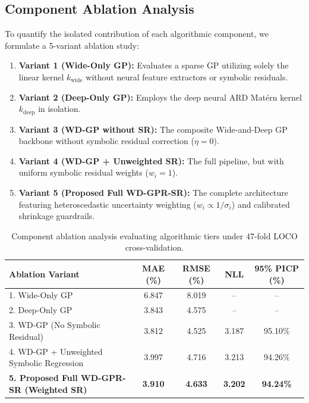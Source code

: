 \documentclass[a4paper,fleqn]{cas-sc}
\begin{document}
\subsection{Component Ablation Analysis}
To quantify the isolated contribution of each algorithmic component, we formulate a 5-variant ablation study:
\begin{enumerate}
    \item \textbf{Variant 1 (Wide-Only GP):} Evaluates a sparse GP utilizing solely the linear kernel $k_{\text{wide}}$ without neural feature extractors or symbolic residuals.
    \item \textbf{Variant 2 (Deep-Only GP):} Employs the deep neural ARD Matérn kernel $k_{\text{deep}}$ in isolation.
    \item \textbf{Variant 3 (WD-GP without SR):} The composite Wide-and-Deep GP backbone without symbolic residual correction ($\eta=0$).
    \item \textbf{Variant 4 (WD-GP + Unweighted SR):} The full pipeline, but with uniform symbolic residual weights ($w_i = 1$).
    \item \textbf{Variant 5 (Proposed Full WD-GPR-SR):} The complete architecture featuring heteroscedastic uncertainty weighting ($w_i \propto 1/\sigma_i$) and calibrated shrinkage guardrails.
\end{enumerate}

\begin{table}[pos=htbp]
\centering
\caption{Component ablation analysis evaluating algorithmic tiers under 47-fold LOCO cross-validation.}
\label{tab:ablation_summary}
\small
\renewcommand{\arraystretch}{1.15}
\begin{tabular}{lcccc}
\toprule
\textbf{Ablation Variant} & \textbf{MAE (\%)} & \textbf{RMSE (\%)} & \textbf{NLL} & \textbf{95\% PICP (\%)} \\
\midrule
1. Wide-Only GP & 6.847 & 8.019 & -- & -- \\
2. Deep-Only GP & 3.843 & 4.575 & -- & -- \\
3. WD-GP (No Symbolic Residual) & 3.812 & 4.525 & 3.187 & 95.10\% \\
4. WD-GP + Unweighted Symbolic Regression & 3.997 & 4.716 & 3.213 & 94.26\% \\
\textbf{5. Proposed Full WD-GPR-SR (Weighted SR)} & \textbf{3.910} & \textbf{4.633} & \textbf{3.202} & \textbf{94.24\%} \\
\bottomrule
\end{tabular}
\end{table}
\end{document}

